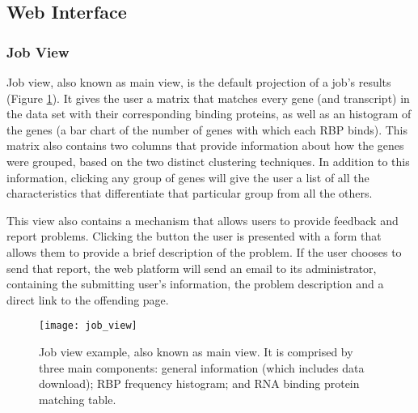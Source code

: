 \subsection{Web Interface}


\subsubsection*{Job View}

Job view, also known as main view, is the default projection of a job's results
(Figure \ref{fig:job_view}). It gives the user a matrix that matches every gene
(and transcript) in the data set with their corresponding binding proteins, as
well as an histogram of the genes (a bar chart of the number of genes with which
each RBP binds). This matrix also contains two columns that provide information
about how the genes were grouped, based on the two distinct clustering
techniques. In addition to this information, clicking any group of genes will
give the user a list of all the characteristics that differentiate that
particular group from all the others.

This view also contains a mechanism that allows users to provide feedback and
report problems. Clicking the  button the user is presented
with a form that allows them to provide a brief description of the problem. If
the user chooses to send that report, the web platform will send an email to its
administrator, containing the submitting user's information, the problem
description and a direct link to the offending page.

\begin{figure}[!htb]
  \begin{center}
    \leavevmode
    \texttt{[image: job\_view]}
    \caption[Job view example]{
      Job view example, also known as main view. It is comprised by three main
      components: general information (which includes data download); RBP
      frequency histogram; and RNA binding protein matching table.
    }
    \label{fig:job_view}
  \end{center}
\end{figure}

